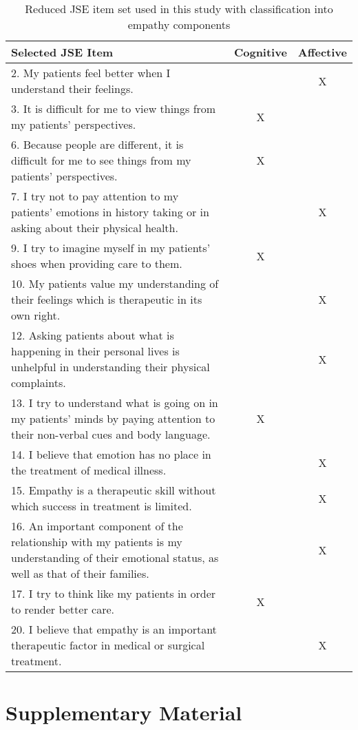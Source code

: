 \begin{table}[H]
    \centering
    \begin{tabular}{p{10.5cm}cc}
    \toprule
    \textbf{Selected JSE Item} & \textbf{Cognitive} & \textbf{Affective} \\
    \midrule
    2. My patients feel better when I understand their feelings. & & X \\
    3. It is difficult for me to view things from my patients’ perspectives. & X & \\
    6. Because people are different, it is difficult for me to see things from my patients’ perspectives. & X & \\
    7. I try not to pay attention to my patients’ emotions in history taking or in asking about their physical health. & & X \\
    9. I try to imagine myself in my patients’ shoes when providing care to them. & X & \\
    10. My patients value my understanding of their feelings which is therapeutic in its own right. & & X \\
    12. Asking patients about what is happening in their personal lives is unhelpful in understanding their physical complaints. & & X \\
    13. I try to understand what is going on in my patients’ minds by paying attention to their non-verbal cues and body language. & X & \\
    14. I believe that emotion has no place in the treatment of medical illness. & & X \\
    15. Empathy is a therapeutic skill without which success in treatment is limited. & & X \\
    16. An important component of the relationship with my patients is my understanding of their emotional status, as well as that of their families. & & X \\
    17. I try to think like my patients in order to render better care. & X & \\
    20. I believe that empathy is an important therapeutic factor in medical or surgical treatment. & & X \\
    \bottomrule
    \end{tabular}
    \caption{Reduced JSE item set used in this study with classification into empathy components}
    \label{tab:jse_shortened}
    \end{table}
    
\chapter{Supplementary Material}


